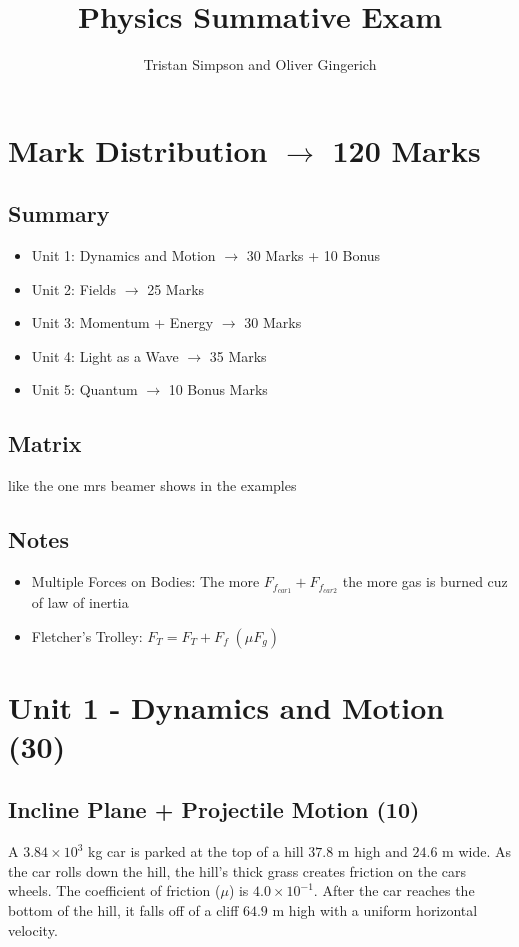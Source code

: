\documentclass{article}
\title{Physics Summative Exam}
\author{Tristan Simpson and Oliver Gingerich}
\begin{document}
\maketitle
\tableofcontents
\doublespacing

\section{Mark Distribution $\to$ 120 Marks}
\subsection{Summary}
\begin{itemize}
    \item Unit 1: Dynamics and Motion $\to$ 30 Marks + 10 Bonus
    \item Unit 2: Fields $\to$ 25 Marks
    \item Unit 3: Momentum + Energy $\to$ 30 Marks
    \item Unit 4: Light as a Wave $\to$ 35 Marks
    \item Unit 5: Quantum $\to$ 10 Bonus Marks
\end{itemize}

\subsection{Matrix}
like the one mrs beamer shows in the examples

\subsection{Notes}
\begin{itemize}
    \item Multiple Forces on Bodies: The more $F_{f_{car1}} + F_{f_{car2}}$ the more gas is burned cuz of law of inertia
    \item Fletcher's Trolley: $F_T = F_T + F_f\;(\mu F_g)$
\end{itemize}

\section{Unit 1 - Dynamics and Motion (30)}
\subsection{Incline Plane + Projectile Motion (10)}
A $3.84 \times 10^3$ kg car is parked at the top of a hill $37.8$ m high and $24.6$ m wide.
As the car rolls down the hill, the hill's thick grass creates friction on the cars wheels. The coefficient of
friction ($\mu$) is $4.0\times 10^{-1}$. After the car reaches the bottom of the hill, it falls
off of a cliff $64.9$ m high with a uniform horizontal velocity.
\end{document}
